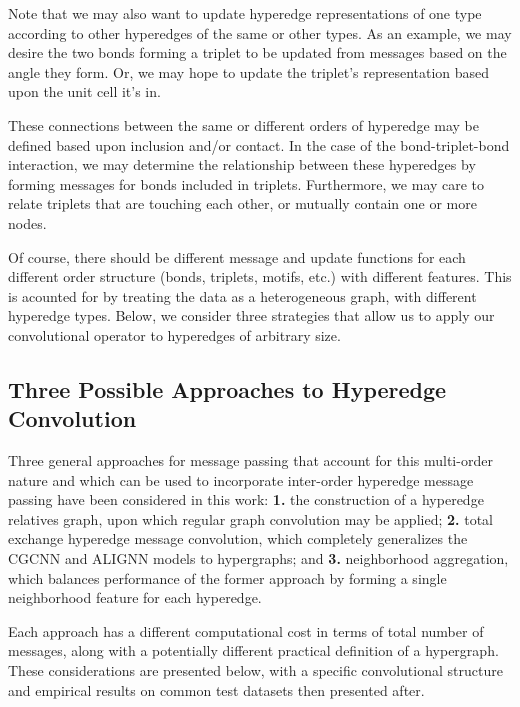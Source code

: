 \documentclass[10pt,a4paper]{article}
\begin{document}
Note that we may also want to update hyperedge representations of one type according to other hyperedges of the same or other types. As an example, we may desire the two bonds forming a triplet to be updated from messages based on the angle they form. Or, we may hope to update the triplet's representation based upon the unit cell it's in. 

These connections between the same or different orders of hyperedge may be defined based upon inclusion and/or contact. In the case of the bond-triplet-bond interaction, we may determine the relationship between these hyperedges by forming messages for bonds included in triplets. Furthermore, we may care to relate triplets that are touching each other, or mutually contain one or more nodes.

Of course, there should be different message and update functions for each different order structure (bonds, triplets, motifs, etc.) with different features. This is acounted for by treating the data as a heterogeneous graph, with different hyperedge types.  Below, we consider three strategies that allow us to apply our convolutional operator to hyperedges of arbitrary size.


\subsection{Three Possible Approaches to Hyperedge Convolution}

Three general approaches for message passing that account for this multi-order nature and which can be used to incorporate inter-order hyperedge message passing have been considered in this work: \textbf{1.} the construction of a hyperedge relatives graph, upon which regular graph convolution may be applied; \textbf{2.} total exchange hyperedge message convolution, which completely generalizes the CGCNN \cite{cgcnn} and ALIGNN \cite{alignn} models to hypergraphs; and \textbf{3.} neighborhood aggregation, which balances performance of the former approach by forming a single neighborhood feature for each hyperedge.

Each approach has a different computational cost in terms of total number of messages, along with a potentially different practical definition of a hypergraph. These considerations are presented below, with a specific convolutional structure and empirical results on common test datasets then presented after.
\end{document}
